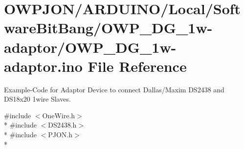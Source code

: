 \hypertarget{OWP__DG__1w-adaptor_8ino}{\section{O\-W\-P\-J\-O\-N/\-A\-R\-D\-U\-I\-N\-O/\-Local/\-Software\-Bit\-Bang/\-O\-W\-P\-\_\-\-D\-G\-\_\-1w-\/adaptor/\-O\-W\-P\-\_\-\-D\-G\-\_\-1w-\/adaptor.ino File Reference}
\label{OWP__DG__1w-adaptor_8ino}
}


Example-\/\-Code for Adaptor Device to connect Dallas/\-Maxim D\-S2438 and D\-S18x20 1wire Slaves.  


{\ttfamily \#include $<$One\-Wire.\-h$>$}\\*
{\ttfamily \#include $<$D\-S2438.\-h$>$}\\*
{\ttfamily \#include $<$P\-J\-O\-N.\-h$>$}\\*
